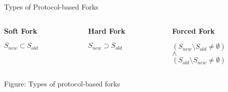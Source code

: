 \documentclass[handout]{beamer}
\begin{document}
\begin{frame}{Types of Protocol-based Forks}


\begin{columns}[T]
	\begin{column}{0.3\textwidth}
		\center		
		\textbf{Soft Fork}\\
		\vspace{0.5em}
		\begin{figure}[h]
  			\resizebox{0.9\textwidth}{!}{
			
			}
		\end{figure}
		\vspace{1em}
		$S_{new}\subset S_{old}$
	\end{column}
	\begin{column}{0.3\textwidth}
		\center
 		\textbf{Hard Fork}\\
 		\vspace{1em}
 		\begin{figure}[h]
  			\center
  			\resizebox{0.9\textwidth}{!}{
			
			}
		\end{figure}
 		\vspace{1.5em}
 		$S_{new}\supset S_{old}$
	\end{column}
		\begin{column}{0.3\textwidth}
		\center
 		\textbf{Forced Fork}\\
 		\vspace{0.5em}
 		\begin{figure}[h]
  			\center
  			\resizebox{0.9\textwidth}{!}{
			
			}
		\end{figure}
		\vspace{0.8em}
 		$(S_{new}\setminus S_{old} \neq \emptyset)$\\$\wedge$\\ $(S_{old}\setminus S_{new} \neq \emptyset)$
	\end{column}
\end{columns}

\vspace{0.5em}

\begin{center}
	Figure: Types of protocol-based forks \cite{schar2020blockchain}
\end{center}

	
\end{frame}
\end{document}
